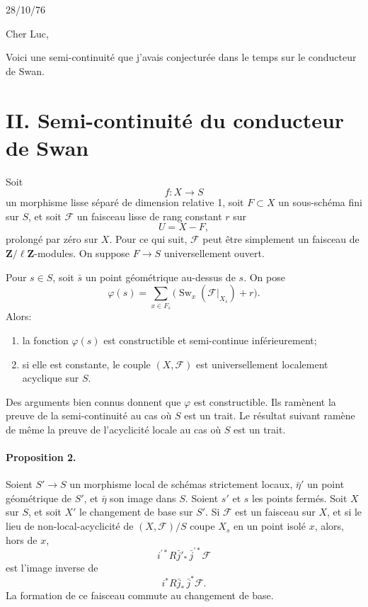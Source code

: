 \documentclass[11pt]{article}
\newcommand{\F}{\mathcal F}
\newcommand{\Zell}{\mathbf Z/\ell\mathbf Z}
\DeclareMathOperator{\Sw}{Sw}
\begin{document}
\begin{flushright}
28/10/76
\end{flushright}

Cher Luc,

Voici une semi-continuité que j'avais conjecturée dans le temps sur le conducteur de Swan.

\section*{II. Semi-continuité du conducteur de Swan}

Soit
\[
  f:X\longrightarrow S
\]
un morphisme lisse séparé de dimension relative 1, soit \(F\subset X\) un sous-schéma fini sur \(S\), et soit \(\F\) un faisceau lisse de rang constant \(r\) sur
\[
  U=X-F,
\]
prolongé par zéro sur \(X\). Pour ce qui suit, \(\F\) peut être simplement un faisceau de \(\Zell\)-modules. On suppose \(F\to S\) universellement ouvert.

Pour \(s\in S\), soit \(\bar s\) un point géométrique au-dessus de \(s\). On pose
\[
  \varphi(s)=\sum_{x\in F_{\bar s}}
  \bigl(\Sw_x(\F|_{X_{\bar s}})+r\bigr).
\]
Alors:
\begin{enumerate}[label=(\roman*)]
\item la fonction \(\varphi(s)\) est constructible et semi-continue inférieurement;
\item si elle est constante, le couple \((X,\F)\) est universellement localement acyclique sur \(S\).
\end{enumerate}

Des arguments bien connus donnent que \(\varphi\) est constructible. Ils ramènent la preuve de la semi-continuité au cas où \(S\) est un trait. Le résultat suivant ramène de même la preuve de l'acyclicité locale au cas où \(S\) est un trait.

\paragraph{Proposition 2.}
Soient \(S'\to S\) un morphisme local de schémas strictement locaux, \(\bar\eta'\) un point géométrique de \(S'\), et \(\bar\eta\) son image dans \(S\). Soient \(s'\) et \(s\) les points fermés. Soit \(X\) sur \(S\), et soit \(X'\) le changement de base sur \(S'\). Si \(\F\) est un faisceau sur \(X\), et si le lieu de non-local-acyclicité de \((X,\F)/S\) coupe \(X_s\) en un point isolé \(x\), alors, hors de \(x\),
\[
  i^{\prime *} R\bar j'_{*}\,\bar j^{\prime *}\F
\]
est l'image inverse de
\[
  i^{*}R\bar j_{*}\,\bar j^{*}\F.
\]
La formation de ce faisceau commute au changement de base.
\end{document}
